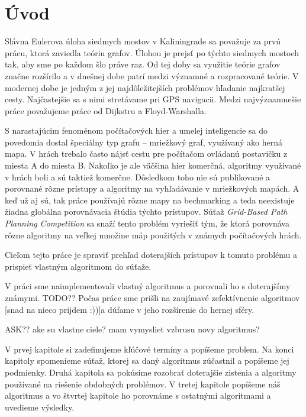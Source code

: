 \chapter*{Úvod}
\cite{sturtevant2012benchmarks}
Slávna Eulerova úloha siedmych mostov v Kaliningrade \cite{euler41} sa považuje za prvú prácu, 
ktorá zaviedla teóriu grafov. Úlohou je prejsť po týchto siedmych mostoch tak, aby sme po každom šlo práve raz.
Od tej doby sa využitie teórie grafov značne
rozšírilo a v dnešnej dobe patrí medzi významné
a rozpracované teórie. V modernej dobe je jedným z jej 
najdôležitejších problémov hľadanie najkratšej cesty. Najčastejšie sa s nimi stretávame pri 
GPS navigacii.
Medzi najvýznamnešie práce považujeme práce od Dijkstru \cite{dijkstra59} a Floyd-Warshalla.

S narastajúcim fenoménom počítačových hier 
a umelej inteligencie sa do povedomia dostal špeciálny typ grafu --
mriežkový graf, využívaný ako herná mapa.
V hrách trebalo často nájsť cestu pre počítačom
ovládanú postavičku z miesta A do miesta B.
Nakoľko je ale väčšina hier komerčná, algoritmy
využívané v hrách boli a sú taktiež komerčne.
Dôsledkom toho nie sú publikované a porovnané rôzne prístupy a algoritmy
na vyhľadávanie v mriežkových mapách. A keď už aj sú, tak práce používajú rôzne mapy
na bechmarking a teda neexistuje žiadna globálna porovnávacia štúdia týchto prístupov.
Súťaž {\sl Grid-Based Path Planning Competition}
 \cite{sturtevantgppc} sa snaží tento problém vyriešiť tým, že ktorá porovnáva rôzne algoritmy na veľkej množine máp
použitých v známych počítačových hrách.

Cieľom tejto práce je spraviť prehľad doterajších prístupov k tomuto problému a prispieť vlastným algoritmom
do súťaže.




V práci sme naimplementovali vlastný algoritmus a porovnali ho s doterajšímy známymi.
TODO?? Počas práce sme prišli na zaujímavé zefektívnenie algoritmov [snad na nieco prijdem :))]a dúfame v jeho rozšírenie do hernej sféry.

ASK?? ake su vlastne ciele? mam vymysliet vzbrusu novy algoritmus?

V prvej kapitole si zadefinujeme kľúčové termíny a popíšeme problem. Na konci kapitoly spomenieme súťaž, ktorej sa daný algoritmus zúčastnil 
a popíšeme jej podmienky.
Druhá kapitola sa pokúsime rozobrať doterajšie zistenia a algoritmy používané na riešenie obdobných problémov.
V tretej kapitole popíšeme náš algoritmus a vo štvrtej kapitole ho porovnáme s ostatnými algoritmami a uvedieme výsledky.
